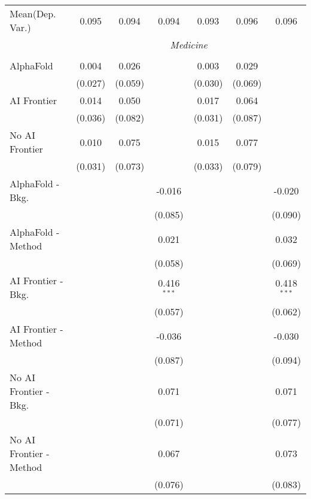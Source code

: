 \begin{tabular}{lcccccc}
Mean(Dep. Var.) & 0.095 & 0.094 & 0.094 & 0.093 & 0.096 & 0.096 \\
 & \multicolumn{6}{c}{\textit{Medicine}} \\ \\
   AlphaFold               & 0.004   & 0.026   &               & 0.003   & 0.029   &   \\   
                           & (0.027) & (0.059) &               & (0.030) & (0.069) &   \\   
   AI Frontier             & 0.014   & 0.050   &               & 0.017   & 0.064   &   \\   
                           & (0.036) & (0.082) &               & (0.031) & (0.087) &   \\   
   No AI Frontier          & 0.010   & 0.075   &               & 0.015   & 0.077   &   \\   
                           & (0.031) & (0.073) &               & (0.033) & (0.079) &   \\   
   AlphaFold - Bkg.        &         &         & -0.016        &         &         & -0.020\\   
                           &         &         & (0.085)       &         &         & (0.090)\\   
   AlphaFold - Method      &         &         & 0.021         &         &         & 0.032\\   
                           &         &         & (0.058)       &         &         & (0.069)\\   
   AI Frontier - Bkg.      &         &         & 0.416$^{***}$ &         &         & 0.418$^{***}$\\   
                           &         &         & (0.057)       &         &         & (0.062)\\   
   AI Frontier - Method    &         &         & -0.036        &         &         & -0.030\\   
                           &         &         & (0.087)       &         &         & (0.094)\\   
   No AI Frontier - Bkg.   &         &         & 0.071         &         &         & 0.071\\   
                           &         &         & (0.071)       &         &         & (0.077)\\   
   No AI Frontier - Method &         &         & 0.067         &         &         & 0.073\\   
                           &         &         & (0.076)       &         &         & (0.083)\\   

\end{tabular}
